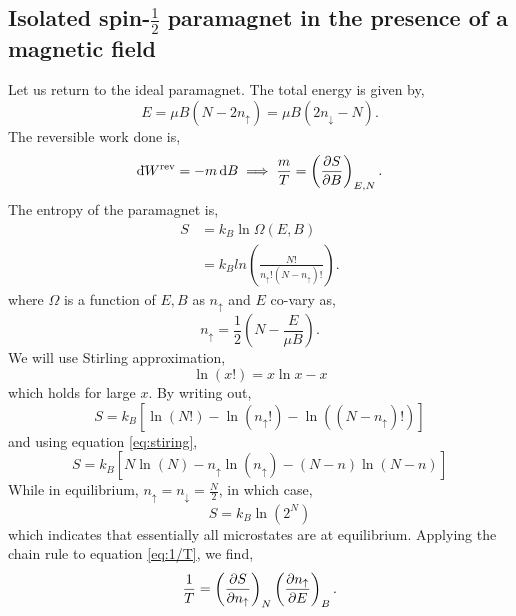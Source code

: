 \documentclass{book}
\newcommand{\dbar}{\mathrm{d}\hspace*{-0.08em}\bar{}\hspace*{0.1em}}
\begin{document}
\subsection{Isolated spin-$\frac{1}{2}$ paramagnet in the presence of a magnetic field}
Let us return to the ideal paramagnet. The total energy is given by,
\begin{equation}
	E = \mu B \left(N - 2n_{\uparrow}\right) = \mu B \left(2n_{\downarrow} - N\right).
\end{equation}
The reversible work done is,
\begin{equation}
	\dbar W^{\text{rev}} = -m\dd{B} \implies \frac{m}{T} = \left(\pdv{S}{B}\right)_{E,N}.
\end{equation}
The entropy of the paramagnet is,
\begin{equation}
	\begin{split}
	S & = k_B \ln \Omega(E, B) \\
	& = k_B ln\left(\frac{N!}{n_{\uparrow}!\left(N - n_{\uparrow}\right)!}\right).
	\end{split}
\end{equation}
where $\Omega$ is a function of $E,B$ as $n_{\uparrow}$ and $E$ co-vary as,
\begin{equation}
	n_{\uparrow} = \frac{1}{2}\left(N - \frac{E}{\mu B}\right).
\end{equation}
We will use Stirling approximation,
\begin{equation}
	\ln (x!) = x\ln x - x \label{eq:stiring}
\end{equation}
which holds for large $x$. By writing out,
\begin{equation}
	S = k_B \left[\ln(N!) - \ln(n_{\uparrow}!) - \ln \left((N-n_{\uparrow})!\right)\right]
\end{equation}
and using equation \eqref{eq:stiring},
\begin{equation}
	S = k_B\left[N\ln(N) - n_{\uparrow}\ln(n_{\uparrow}) - (N-n)\ln(N-n)\right]
\end{equation}
While in equilibrium, $n_{\uparrow} = n_{\downarrow} = \frac{N}{2}$, in which case,
\begin{equation}
	S = k_B\ln(2^N)
\end{equation}
which indicates that essentially all microstates are at equilibrium. Applying the chain rule to equation \eqref{eq:1/T}, we find,
\begin{equation}
	\frac{1}{T} = \left(\pdv{S}{n_{\uparrow}}\right)_{N}\left(\pdv{n_{\uparrow}}{E}\right)_B.
\end{equation}
\end{document}
